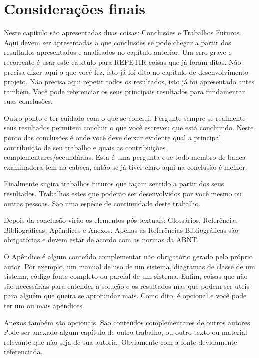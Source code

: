 \chapter{Considerações finais}
\label{ch:conc}


Neste capítulo são apresentadas duas coisas: Conclusões e Trabalhos Futuros. Aqui devem ser apresentadas a que conclusões se pode chegar a partir dos resultados apresentados e analisados no capítulo anterior. Um erro grave e recorrente é usar este capítulo para REPETIR coisas que já foram ditas. Não precisa dizer aqui o que você fez, isto já foi dito no capítulo de desenvolvimento projeto. Não precisa aqui repetir todos os resultados, isto já foi apresentado antes também. Você pode referenciar os seus principais resultados para fundamentar suas conclusões. 

Outro ponto é ter cuidado com o que se conclui. Pergunte sempre se realmente seus resultados permitem concluir o que você escreveu que está concluindo. Neste ponto das conclusões é onde você deve deixar evidente qual a principal contribuição de seu trabalho e quais as contribuições complementares/secundárias. Esta é uma pergunta que todo membro de banca examinadora tem na cabeça, então se já tiver claro aqui na conclusão é melhor. 

Finalmente sugira trabalhos futuros que façam sentido a partir dos seus resultados. Trabalhos estes que poderão ser desenvolvidos por você mesmo ou outras pessoas. São uma espécie de continuidade deste trabalho. 

Depois da conclusão virão os elementos pós-textuais: Glossários, Referências Bibliográficas, Apêndices e Anexos. Apenas as Referências Bibliográficas são obrigatórias e devem estar de acordo com as normas da ABNT. 

 O Apêndice é algum conteúdo complementar não obrigatório gerado pelo próprio autor. Por exemplo, um manual de uso de um sistema, diagramas de classe de um sistema, código-fonte completo ou parcial de um sistema. Enfim, coisas que não são necessárias para entender a solução e os resultados mas que podem ser úteis para alguém que queira se aprofundar mais. Como dito, é opcional e você pode ter um ou mais apêndices.

Anexos também são opcionais. São conteúdos complementares de outros autores. Pode ser anexado algum capítulo de outro trabalho, ou outro texto ou material relevante que não seja de sua autoria. Obviamente com a fonte devidamente referenciada. 

